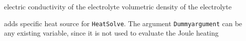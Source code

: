    \sifbegin
     electric conductivity of the electrolyte
     volumetric density of the electrolyte
   \sifend

   \sifbegin
     adds specific heat source for \texttt{HeatSolve}.  
     The argument \texttt{Dummyargument} can be any existing variable, since it is not used to evaluate the Joule heating	
   \sifend
\sifend


\begin{versiona}


\end{versiona}


